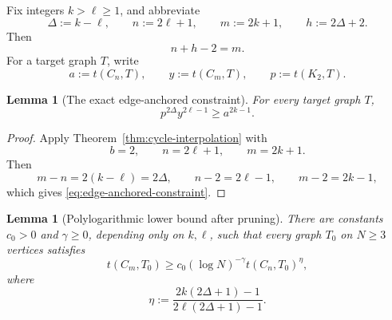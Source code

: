 \documentclass[11pt]{article}
\newtheorem{lemma}[theorem]{Lemma}
\newcommand{\1}{\mathbf{1}}
\begin{document}
Fix integers $k>\ell\ge1$, and abbreviate
\[
  \Delta:=k-\ell,
  \qquad
  n:=2\ell+1,
  \qquad
  m:=2k+1,
  \qquad
  h:=2\Delta+2.
\]
Then
\[
  n+h-2=m.
\]
For a target graph $T$, write
\[
  a:=t(C_n,T),
  \qquad
  y:=t(C_m,T),
  \qquad
  p:=t(K_2,T).
\]

\begin{lemma}[The exact edge-anchored constraint]
\label{lem:edge-anchored-constraint}
For every target graph $T$,
\[
  p^{2\Delta}y^{2\ell-1}
  \ge
  a^{2k-1}.
  \tag{7.15}\label{eq:edge-anchored-constraint}
\]
\end{lemma}

\begin{proof}
Apply Theorem~\ref{thm:cycle-interpolation} with
\[
  b=2,
  \qquad
  n=2\ell+1,
  \qquad
  m=2k+1.
\]
Then
\[
  m-n=2(k-\ell)=2\Delta,
  \qquad
  n-2=2\ell-1,
  \qquad
  m-2=2k-1,
\]
which gives \eqref{eq:edge-anchored-constraint}.
\end{proof}

\begin{lemma}[Polylogarithmic lower bound after pruning]
\label{lem:polylog-combined}
There are constants $c_0>0$ and $\gamma\ge0$, depending only on $k,\ell$, such
that every graph $T_0$ on $N\ge3$ vertices satisfies
\[
  t(C_m,T_0)
  \ge
  c_0(\log N)^{-\gamma}
  t(C_n,T_0)^{\eta},
  \tag{7.16}\label{eq:polylog-final}
\]
where
\[
  \eta
  :=
  \frac{2k(2\Delta+1)-1}
       {2\ell(2\Delta+1)-1}.
  \tag{7.17}\label{eq:eta-definition}
\]
\end{lemma}
\end{document}
